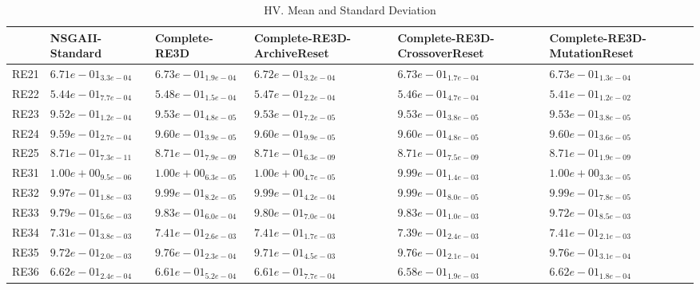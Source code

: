\documentclass{article}
\begin{document}
\begin{table}
\caption{HV. Mean and Standard Deviation}
\label{table: HV}
\centering
\begin{scriptsize}
\begin{tabular}{llllll}
\hline & NSGAII-Standard & Complete-RE3D & Complete-RE3D-ArchiveReset & Complete-RE3D-CrossoverReset &  Complete-RE3D-MutationReset\\
\hline 
RE21 & $  6.71e-01_{ 3.3e-04}$ & $  6.73e-01_{ 1.9e-04}$ & $  6.72e-01_{ 3.2e-04}$ & \cellcolor{gray25}$  6.73e-01_{ 1.7e-04}$ & \cellcolor{gray95}$  6.73e-01_{ 1.3e-04}$ \\
RE22 & $  5.44e-01_{ 7.7e-04}$ & \cellcolor{gray95}$  5.48e-01_{ 1.5e-04}$ & \cellcolor{gray25}$  5.47e-01_{ 2.2e-04}$ & $  5.46e-01_{ 4.7e-04}$ & $  5.41e-01_{ 1.2e-02}$ \\
RE23 & $  9.52e-01_{ 1.2e-04}$ & \cellcolor{gray25}$  9.53e-01_{ 4.8e-05}$ & $  9.53e-01_{ 7.2e-05}$ & \cellcolor{gray95}$  9.53e-01_{ 3.8e-05}$ & $  9.53e-01_{ 3.8e-05}$ \\
RE24 & $  9.59e-01_{ 2.7e-04}$ & \cellcolor{gray95}$  9.60e-01_{ 3.9e-05}$ & $  9.60e-01_{ 9.9e-05}$ & $  9.60e-01_{ 4.8e-05}$ & \cellcolor{gray25}$  9.60e-01_{ 3.6e-05}$ \\
RE25 & \cellcolor{gray95}$  8.71e-01_{ 7.3e-11}$ & $  8.71e-01_{ 7.9e-09}$ & $  8.71e-01_{ 6.3e-09}$ & $  8.71e-01_{ 7.5e-09}$ & \cellcolor{gray25}$  8.71e-01_{ 1.9e-09}$ \\
RE31 & \cellcolor{gray95}$  1.00e+00_{ 9.5e-06}$ & $  1.00e+00_{ 6.3e-05}$ & $  1.00e+00_{ 4.7e-05}$ & $  9.99e-01_{ 1.4e-03}$ & \cellcolor{gray25}$  1.00e+00_{ 3.3e-05}$ \\
RE32 & $  9.97e-01_{ 1.8e-03}$ & \cellcolor{gray25}$  9.99e-01_{ 8.2e-05}$ & $  9.99e-01_{ 4.2e-04}$ & $  9.99e-01_{ 8.0e-05}$ & \cellcolor{gray95}$  9.99e-01_{ 7.8e-05}$ \\
RE33 & $  9.79e-01_{ 5.6e-03}$ & \cellcolor{gray95}$  9.83e-01_{ 6.0e-04}$ & $  9.80e-01_{ 7.0e-04}$ & \cellcolor{gray25}$  9.83e-01_{ 1.0e-03}$ & $  9.72e-01_{ 8.5e-03}$ \\
RE34 & $  7.31e-01_{ 3.8e-03}$ & \cellcolor{gray95}$  7.41e-01_{ 2.6e-03}$ & \cellcolor{gray25}$  7.41e-01_{ 1.7e-03}$ & $  7.39e-01_{ 2.4e-03}$ & $  7.41e-01_{ 2.1e-03}$ \\
RE35 & $  9.72e-01_{ 2.0e-03}$ & \cellcolor{gray95}$  9.76e-01_{ 2.3e-04}$ & $  9.71e-01_{ 4.5e-03}$ & $  9.76e-01_{ 2.1e-04}$ & \cellcolor{gray25}$  9.76e-01_{ 3.1e-04}$ \\
RE36 & \cellcolor{gray25}$  6.62e-01_{ 2.4e-04}$ & $  6.61e-01_{ 5.2e-04}$ & $  6.61e-01_{ 7.7e-04}$ & $  6.58e-01_{ 1.9e-03}$ & \cellcolor{gray95}$  6.62e-01_{ 1.8e-04}$ \\

\end{tabular}
\end{scriptsize}
\end{table}
\end{document}
